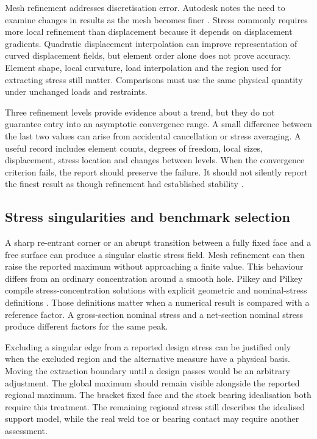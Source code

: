 Mesh refinement addresses discretisation error. Autodesk notes the need to examine changes in results as the mesh becomes finer \cite{autodeskMesh}. Stress commonly requires more local refinement than displacement because it depends on displacement gradients. Quadratic displacement interpolation can improve representation of curved displacement fields, but element order alone does not prove accuracy. Element shape, local curvature, load interpolation and the region used for extracting stress still matter. Comparisons must use the same physical quantity under unchanged loads and restraints.

Three refinement levels provide evidence about a trend, but they do not guarantee entry into an asymptotic convergence range. A small difference between the last two values can arise from accidental cancellation or stress averaging. A useful record includes element counts, degrees of freedom, local sizes, displacement, stress location and changes between levels. When the convergence criterion fails, the report should preserve the failure. It should not silently report the finest result as though refinement had established stability \cite{asmeVV10,nasa7009}.

\subsection{Stress singularities and benchmark selection}
\label{sec:lit-singularities}

A sharp re-entrant corner or an abrupt transition between a fully fixed face and a free surface can produce a singular elastic stress field. Mesh refinement can then raise the reported maximum without approaching a finite value. This behaviour differs from an ordinary concentration around a smooth hole. Pilkey and Pilkey compile stress-concentration solutions with explicit geometric and nominal-stress definitions \cite{peterson2008}. Those definitions matter when a numerical result is compared with a reference factor. A gross-section nominal stress and a net-section nominal stress produce different factors for the same peak.

Excluding a singular edge from a reported design stress can be justified only when the excluded region and the alternative measure have a physical basis. Moving the extraction boundary until a design passes would be an arbitrary adjustment. The global maximum should remain visible alongside the reported regional maximum. The bracket fixed face and the stock bearing idealisation both require this treatment. The remaining regional stress still describes the idealised support model, while the real weld toe or bearing contact may require another assessment.


